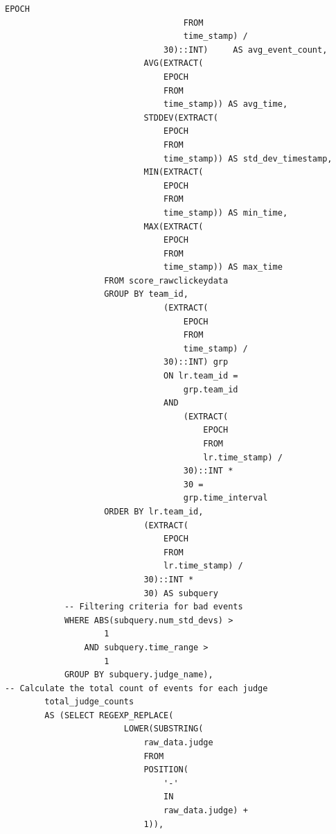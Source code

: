 \documentclass[11pt]{article}
\begin{document}
\begin{lstlisting}[style=sql, caption={Query to calculate timing stats}, label={lst:sql_judge_accuracy_query}, ]
                                    EPOCH
                                    FROM
                                    time_stamp) /
                                30)::INT)     AS avg_event_count,
                            AVG(EXTRACT(
                                EPOCH
                                FROM
                                time_stamp)) AS avg_time,
                            STDDEV(EXTRACT(
                                EPOCH
                                FROM
                                time_stamp)) AS std_dev_timestamp,
                            MIN(EXTRACT(
                                EPOCH
                                FROM
                                time_stamp)) AS min_time,
                            MAX(EXTRACT(
                                EPOCH
                                FROM
                                time_stamp)) AS max_time
                    FROM score_rawclickeydata
                    GROUP BY team_id,
                                (EXTRACT(
                                    EPOCH
                                    FROM
                                    time_stamp) /
                                30)::INT) grp
                                ON lr.team_id =
                                    grp.team_id
                                AND
                                    (EXTRACT(
                                        EPOCH
                                        FROM
                                        lr.time_stamp) /
                                    30)::INT *
                                    30 =
                                    grp.time_interval
                    ORDER BY lr.team_id,
                            (EXTRACT(
                                EPOCH
                                FROM
                                lr.time_stamp) /
                            30)::INT *
                            30) AS subquery
            -- Filtering criteria for bad events
            WHERE ABS(subquery.num_std_devs) >
                    1
                AND subquery.time_range >
                    1
            GROUP BY subquery.judge_name),
-- Calculate the total count of events for each judge
        total_judge_counts
        AS (SELECT REGEXP_REPLACE(
                        LOWER(SUBSTRING(
                            raw_data.judge
                            FROM
                            POSITION(
                                '-'
                                IN
                                raw_data.judge) +
                            1)),

\end{lstlisting}
\end{document}
